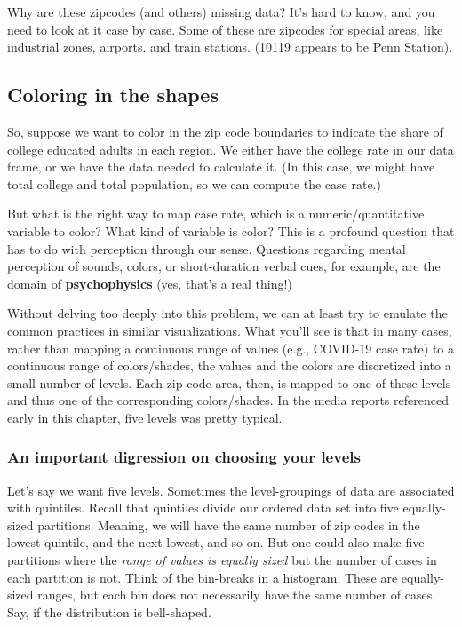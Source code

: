 \documentclass[
  openany]{book}
\begin{document}
Why are these zipcodes (and others) missing data? It's hard to know, and you need to look at it case by case. Some of these are zipcodes for special areas, like industrial zones, airports. and train stations. (10119 appears to be Penn Station).

\hypertarget{coloring-in-the-shapes}{%
\subsection*{Coloring in the shapes}\label{coloring-in-the-shapes}}

So, suppose we want to color in the zip code boundaries to indicate the share of college educated adults in each region. We either have the college rate in our data frame, or we have the data needed to calculate it. (In this case, we might have total college and total population, so we can compute the case rate.)

But what is the right way to map case rate, which is a numeric/quantitative variable to color? What kind of variable is color? This is a profound question that has to do with perception through our sense. Questions regarding mental perception of sounds, colors, or short-duration verbal cues, for example, are the domain of \textbf{psychophysics} (yes, that's a real thing!)

Without delving too deeply into this problem, we can at least try to emulate the common practices in similar visualizations. What you'll see is that in many cases, rather than mapping a continuous range of values (e.g., COVID-19 case rate) to a continuous range of colors/shades, the values and the colors are discretized into a small number of levels. Each zip code area, then, is mapped to one of these levels and thus one of the corresponding colors/shades. In the media reports referenced early in this chapter, five levels was pretty typical.

\hypertarget{an-important-digression-on-choosing-your-levels}{%
\subsubsection*{An important digression on choosing your levels}\label{an-important-digression-on-choosing-your-levels}}

Let's say we want five levels. Sometimes the level-groupings of data are associated with quintiles. Recall that quintiles divide our ordered data set into five equally-sized partitions. Meaning, we will have the same number of zip codes in the lowest quintile, and the next lowest, and so on. But one could also make five partitions where the \emph{range of values is equally sized} but the number of cases in each partition is not. Think of the bin-breaks in a histogram. These are equally-sized ranges, but each bin does not necessarily have the same number of cases. Say, if the distribution is bell-shaped.
\end{document}
